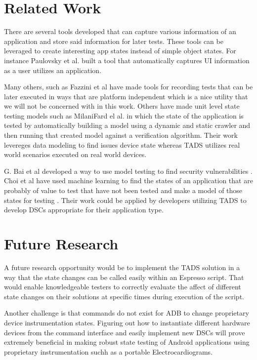 \section{Related Work}
There are several tools developed that can capture various information of an application and store said information for later tests.  These tools can be leveraged to create interesting app states instead of simple object states.  For instance Paulovsky et al. \cite{7962332} built a tool that automatically captures UI information as a user utilizes an application. 

Many others, such as Fazzini et al \cite{7927971} have made tools for recording tests that can be later executed in ways that are platform independent which is a nice utility that we will not be concerned with in this work.  Others have made unit level state testing models such as MilaniFard el al. \cite{MilaniFard:2014:LET:2642937.2642991} in which the state of the application is tested by automatically building a model using a dynamic and static crawler and then running that created model against a verification algorithm.  Their work levereges data modeling to find issues device state whereas TADS utilizes real world scenarios executed on real world devices.  

G. Bai et al developed a way to use model testing to find security vulnerabilities \cite{7911333}.  Choi et al have used machine learning to find the states of an application that are probably of value to test that have not been tested and make a model of those states for testing \cite{Choi:2013:GGT:2544173.2509552}.  Their work could be applied by developers utilizing TADS to develop DSCs appropriate for their application type. \\


\section{Future Research}
A future research opportunity would be to implement the TADS solution in a way that the state changes can be called easily within an Espresso script.  That would enable knowledgeable testers to correctly evaluate the affect of different state changes on their solutions at specific times during execution of the script.   

Another challenge is that commands do not exist for ADB to change proprietary device instrumentation states.  Figuring out how to instantiate different hardware devices from the command interface and easily implement new DSCs will prove extremely beneficial in making robust state testing of Android applications using proprietary instrumentation suchh as a portable Electrocardiograms.  


